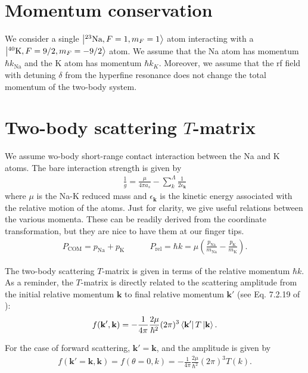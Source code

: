 \documentclass{article}
\theoremstyle{definition}
\begin{document}
\section{Momentum conservation}

We consider a single $\ket{^{23}\text{Na}, F=1, m_F=1}$ atom interacting with a $\ket{^{40} \text{K}, F=9/2, m_F = -9/2}$ atom. We assume that the Na atom has momentum $\hbar k_\text{Na}$ and the K atom has momentum $\hbar k_{K}$. Moreover, we assume that the rf field with detuning $\delta$ from the hyperfine resonance does not change the total momentum of the two-body system. 


\section{Two-body scattering $T$-matrix}

We assume wo-body short-range contact interaction between the Na and K atoms. The bare interaction strength is given by 
\begin{align}
 \frac{1}{g} = \frac{\mu}{4\pi a_s} - \sum_k^\Lambda  \frac{1}{2\epsilon_\mathbf{k}} 
\end{align}
where $\mu$ is the Na-K reduced mass and $\epsilon_\mathbf{k}$ is the kinetic energy associated with the relative motion of the atoms. Just for clarity, we give useful relations between the various momenta. These can be readily derived from the coordinate transformation, but they are nice to have them at our finger tips.
\begin{align}
P_\text{COM} = p_\text{Na} + p_\text{K}
\quad\quad\quad 
P_\text{rel} = \hbar k = \mu \left( \frac{p_\text{Na}}{m_\text{Na}} - \frac{p_\text{K}}{m_\text{K}}  \right).
\end{align}

\noindent The two-body scattering $T$-matrix is given in terms of the relative momentum $\hbar k$. As a reminder, the $T$-matrix is directly related to the scattering amplitude from the initial relative momentum  $\mathbf{k}$ to final relative momentum $\mathbf{k}'$ (see Eq. 7.2.19 of \cite{sakurai1995modern}):
\begin{align}
f(\mathbf{k}',\mathbf{k}) = -\frac{1}{4\pi} \frac{2\mu}{\hbar^2} (2\pi)^3 \bra{\mathbf{k}' } T \ket{\mathbf{k}}.
\end{align}

\noindent For the case of forward scattering, $\mathbf{k}' = \mathbf{k}$, and the amplitude is given by 
\begin{align}\label{eq:fwd-amplitude}
f(\mathbf{k}'=\mathbf{k},\mathbf{k}) = f(\theta = 0, k) =  -\frac{1}{4\pi} \frac{2\mu}{\hbar^2} (2\pi)^3 T(k). 
\end{align}
\end{document}
